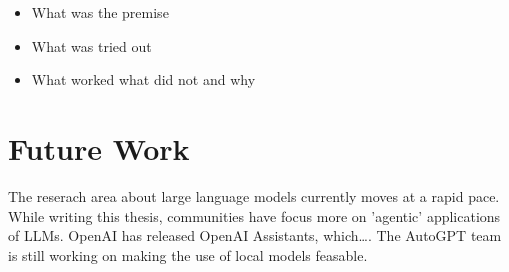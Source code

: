 \documentclass[english, version-2022-01]{uzl-thesis}
\begin{document}
\begin{itemize}
    \item What was the premise
    \item What was tried out
    \item What worked what did not and why
\end{itemize}

\section{Future Work}

The reserach area about large language models currently moves at a rapid pace.
While writing this thesis, communities have focus more on 'agentic' applications of LLMs.
OpenAI has released OpenAI Assistants, which\dots.
The AutoGPT team is still working on making the use of local models feasable.
\end{document}
